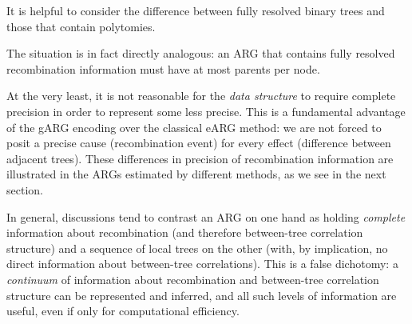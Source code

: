 \documentclass{article}
\begin{document}
It is helpful to consider the difference between fully
resolved binary trees and those that contain polytomies.

The situation is in fact directly analogous: an ARG that
contains fully resolved recombination information must have
at most parents per node.


At the very least, it is not reasonable for the \emph{data
structure} to require complete precision in order to
represent some less precise. This is a fundamental
advantage of the gARG encoding over the classical eARG
method: we are not forced to posit a precise cause (recombination
event) for every effect (difference between adjacent trees).
These differences in precision of recombination
information are illustrated in the ARGs estimated by different
methods, as we see in the next section.

In general, discussions tend to contrast an ARG
on one hand as holding \emph{complete} information about recombination
(and therefore between-tree correlation structure)
and a sequence of local trees on the other (with, by implication,
no direct information about between-tree correlations).
This is a false dichotomy:
a \emph{continuum} of information about recombination and between-tree
correlation structure can be represented and inferred, and all
such levels of information are useful, even if only for computational
efficiency.
\end{document}

